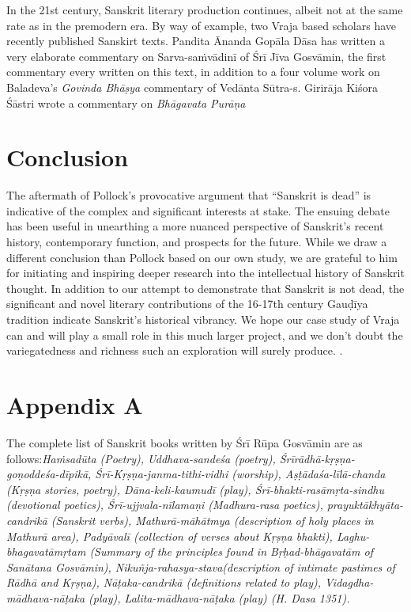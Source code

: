 In the 21st century, Sanskrit literary production continues, albeit not at the same rate as in the premodern era. By way of example, two Vraja based scholars have recently published Sanskirt texts. Pandita Ānanda Gopāla Dāsa has written a very elaborate commentary on Sarva-saṁvādinī of Śrī Jīva Gosvāmin, the first commentary every written on this text, in addition to a four volume work on Baladeva’s {\sl Govinda Bhāṣya} commentary of Vedānta Sūtra-s. Girirāja Kiśora Śāstri wrote a commentary on {\sl Bhāgavata Purāṇa}

\section*{Conclusion}

The aftermath of Pollock’s provocative argument that “Sanskrit is dead” is indicative of the complex and significant interests at stake. The ensuing debate has been useful in unearthing a more nuanced perspective of Sanskrit’s recent history, contemporary function, and prospects for the future. While we draw a different conclusion than Pollock based on our own study, we are grateful to him for initiating and inspiring deeper research into the intellectual history of Sanskrit thought. In addition to our attempt to demonstrate that Sanskrit is not dead, the significant and novel literary contributions of the 16-17th century Gauḍīya tradition indicate Sanskrit’s historical vibrancy. We hope our case study of Vraja can and will play a small role in this much larger project, and we don’t doubt the variegatedness and richness such an exploration will surely produce. .
\newpage


\section*{Appendix A}

The complete list of Sanskrit books written by Śrī Rūpa Gosvāmin are as follows:{\sl  Haṁsadūta {\rm (Poetry)}, Uddhava-sandeśa {\rm (poetry)}, Śrīrādhā-\Break kṛṣṇa-goṇoddeśa-dīpikā, Śrī-Kṛṣṇa-janma-tithi-vidhi {\rm (worship)}, Aṣṭādaśa-\Break līlā-chanda {\rm (Kṛṣṇa stories, poetry)}, Dāna-keli-kaumudī {\rm (play)}, Śrī-bhakti-rasāmṛta-sindhu {\rm (devotional poetics)}, Śrī-ujjvala-nīlamaṇi {\rm (Madhura-\Break rasa poetics)}, prayuktākhyāta-candrikā {\rm (Sanskrit verbs)}, Mathurā-\Break māhātmya {\rm (description of holy places in Mathurā area)}, Padyāvalī {\rm (collection of verses about Kṛṣṇa bhakti)}, Laghu-bhagavatāmṛtam {\rm (Summary of the principles found in Bṛḥad-bhāgavatām of Sanātana Gosvāmin)}, Nikuñja-rahasya-stava{\rm (description of intimate pastimes of Rādhā and Kṛṣṇa)}, Nāṭaka-candrikā {\rm (definitions related to play)}, Vidagdha-mādha\-va-nāṭaka {\rm (play)}, Lalita-mādhava-nāṭaka {\rm (play)} {\rm (H. Dasa 1351)}.}

